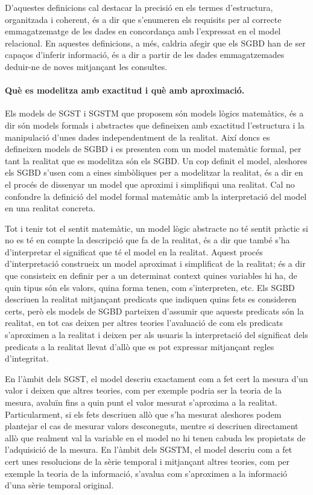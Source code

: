 D'aquestes definicions cal destacar la precisió en els termes
d'estructura, organitzada i coherent, és a dir que s'enumeren els
requisits per al correcte emmagatzematge de les dades en concordança
amb l'expressat en el model relacional.  En aquestes definicions, a
més, caldria afegir que els \gls{SGBD} han de ser capaços d'inferir
informació, és a dir a partir de les dades emmagatzemades deduir-ne de
noves mitjançant les consultes.





\paragraph{Què es modelitza amb exactitud i què amb aproximació.}
Els models de \gls{SGST} i \gls{SGSTM} que proposem són models lògics
matemàtics, és a dir són models formals i abstractes que defineixen
amb exactitud l'estructura i la manipulació d'unes dades
independentment de la realitat.  Així doncs es defineixen models de
\gls{SGBD} i es presenten com un model matemàtic formal, per tant la
realitat que es modelitza són els \gls{SGBD}. Un cop definit el model,
aleshores els \gls{SGBD} s'usen com a eines simbòliques per a
modelitzar la realitat, és a dir en el procés de dissenyar un model
que aproximi i simplifiqui una realitat. Cal no confondre la definició
del model formal matemàtic amb la interpretació del model en una
realitat concreta.

Tot i tenir tot el sentit matemàtic, un model lògic abstracte no té
sentit pràctic si no es té en compte la descripció que fa de la
realitat, és a dir que també s'ha d'interpretar el significat que té
el model en la realitat.  Aquest procés d'interpretació construeix un
model aproximat i simplificat de la realitat; és a dir que consisteix
en definir per a un determinat context quines variables hi ha, de quin
tipus són els valors, quina forma tenen, com s'interpreten, etc.  Els
\gls{SGBD} descriuen la realitat mitjançant predicats que indiquen
quins fets es consideren certs, però els models de \gls{SGBD}
parteixen d'assumir que aquests predicats són la realitat, en tot cas
deixen per altres teories l'avaluació de com els predicats s'aproximen
a la realitat i deixen per als usuaris la interpretació del significat
dels predicats a la realitat llevat d'allò que es pot expressar
mitjançant regles d'integritat.


En l'àmbit dels \gls{SGST}, el model descriu
exactament com a fet cert la mesura d'un valor i deixen que altres
teories, com per exemple podria ser la teoria de la mesura, avaluïn
fins a quin punt el valor mesurat s'aproxima a la
realitat. Particularment, si els fets descriuen allò que s'ha mesurat
aleshores podem plantejar el cas de mesurar valors desconeguts, mentre
si descriuen directament allò que realment val la variable en el model
no hi tenen cabuda les propietats de l'adquisició de la mesura. 
En l'àmbit dels \gls{SGSTM}, el model descriu com a fet cert unes
resolucions de la sèrie temporal i mitjançant altres teories, com per
exemple la teoria de la informació, s'avalua com s'aproximen a la
informació d'una sèrie temporal original.



